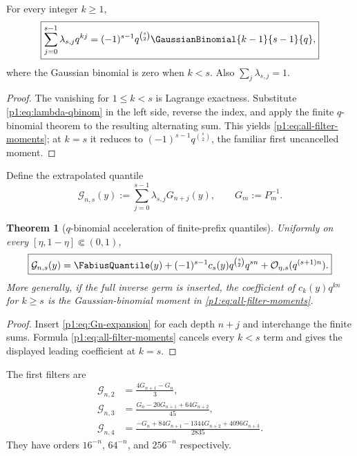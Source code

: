 \documentclass[11pt,oneside]{article}
\numberwithin{equation}{section}
\newtheorem{theorem}{Theorem}[section]
\theoremstyle{definition}
\theoremstyle{remark}
\begin{document}
\begin{lemma}
\label{p1:lem:filter-moments}
For every integer $k\ge1$,
\begin{equation}
 \boxed{
 \sum_{j=0}^{s-1}\lambda_{s,j}q^{kj}
 =(-1)^{s-1}q^{\binom s2}
 \GaussianBinomial{k-1}{s-1}{q},}
 \label{p1:eq:all-filter-moments}
\end{equation}
where the Gaussian binomial is zero when $k<s$.  Also
$\sum_j\lambda_{s,j}=1$.
\end{lemma}

\begin{proof}
The vanishing for $1\le k<s$ is Lagrange exactness.  Substitute
\eqref{p1:eq:lambda-qbinom} in the left side, reverse the index, and apply the finite
$q$-binomial theorem \cite{p1:GasperRahman,p1:AndrewsPartitions} to the resulting alternating sum.  This yields
\eqref{p1:eq:all-filter-moments}; at $k=s$ it reduces to
$(-1)^{s-1}q^{\binom s2}$, the familiar first uncancelled moment.
\end{proof}

Define the extrapolated quantile
\begin{equation}
 \mathcal G_{n,s}(y):=\sum_{j=0}^{s-1}\lambda_{s,j}G_{n+j}(y),
 \qquad G_m:=P_m^{-1}.
 \label{p1:eq:G-richardson}
\end{equation}

\begin{theorem}[$q$-binomial acceleration of finite-prefix quantiles]
\label{p1:thm:quantile-richardson}
Uniformly on every $[\eta,1-\eta]\Subset(0,1)$,
\begin{equation}
 \boxed{
 \mathcal G_{n,s}(y)=\FabiusQuantile(y)
 +(-1)^{s-1}c_s(y)q^{\binom s2}q^{sn}
 +\BigO_{\eta,s}(q^{(s+1)n}).}
 \label{p1:eq:quantile-richardson}
\end{equation}
More generally, if the full inverse germ is inserted, the coefficient of $c_k(y)q^{kn}$
for $k\ge s$ is the Gaussian-binomial moment in \eqref{p1:eq:all-filter-moments}.
\end{theorem}

\begin{proof}
Insert \eqref{p1:eq:Gn-expansion} for each depth $n+j$ and interchange the finite
sums.  Formula \eqref{p1:eq:all-filter-moments} cancels every $k<s$ term and gives
the displayed leading coefficient at $k=s$.
\end{proof}

The first filters are
\begin{align}
 \mathcal G_{n,2}&=\frac{4G_{n+1}-G_n}{3},
 \label{p1:eq:R2-filter}\\
 \mathcal G_{n,3}&=\frac{G_n-20G_{n+1}+64G_{n+2}}{45},
 \label{p1:eq:R3-filter}\\
 \mathcal G_{n,4}&=
 \frac{-G_n+84G_{n+1}-1344G_{n+2}+4096G_{n+3}}{2835}.
 \label{p1:eq:R4-filter}
\end{align}
They have orders $16^{-n}$, $64^{-n}$, and $256^{-n}$ respectively.
\end{document}
